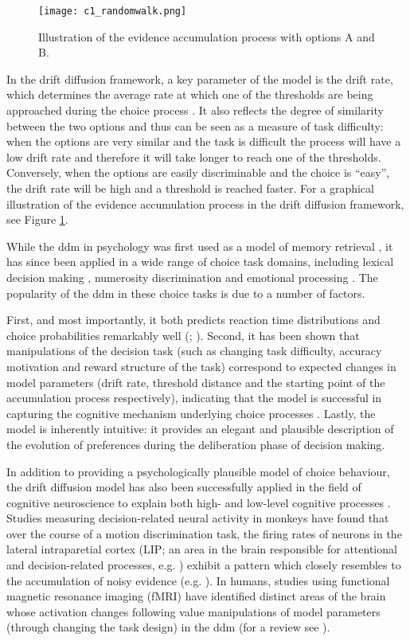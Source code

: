 \documentclass[11pt,a4paper]{article}
\begin{document}
\begin{figure}[h]
\centering
\caption{Illustration of the evidence accumulation process with options A and
B.}
\texttt{[image: c1\_randomwalk.png]}
\label{fig:randomwalk}
\end{figure}


In the drift diffusion framework, a key parameter of the model is the drift rate, which determines the average rate at which one of the thresholds are being approached during the choice process \cite{Voss2004a}. It also reflects the degree of similarity between the two options and thus can be seen as a measure of task difficulty: when the options are very similar and the task is difficult the process will have a low drift rate and therefore it will take longer to reach one of the thresholds. Conversely, when the options are easily discriminable and the choice is “easy”, the drift rate will be high and a threshold is reached faster. For a graphical illustration of the evidence accumulation process in the drift diffusion framework, see Figure \ref{fig:randomwalk}.

While the ddm in psychology was first used as a model of memory retrieval \cite{Ratcliff1978b}, it has since been applied in a wide range of choice task domains, including lexical decision making \cite{Ratcliff2004}, numerosity discrimination \cite{Leite2011} and emotional processing \cite{Mueller2016}. The popularity of the ddm in these choice tasks is due to a number of factors. 

First, and most importantly, it both predicts reaction time distributions and choice probabilities remarkably well (; ). Second, it has been shown that manipulations of the decision task (such as changing task difficulty, accuracy motivation and reward structure of the task) correspond to expected changes in model parameters (drift rate, threshold distance and the starting point of the accumulation process respectively), indicating that the model is successful in capturing the cognitive mechanism underlying choice processes \cite{Voss2004a}. Lastly, the model is inherently intuitive: it provides an elegant and plausible description of the evolution of preferences during the deliberation phase of decision making.

In addition to providing a psychologically plausible model of choice behaviour, the drift diffusion model has also been successfully applied in the field of cognitive neuroscience to explain both high- and low-level cognitive processes \cite{Forstmann2016}. Studies measuring decision-related neural activity in monkeys have found that over the course of a motion discrimination task, the firing rates of neurons in the lateral intraparetial cortex (LIP; an area in the brain responsible for attentional and decision-related processes, e.g. ) exhibit a pattern which closely resembles to the accumulation of noisy evidence (e.g. ). In humans, studies using functional magnetic resonance imaging (fMRI) have identified distinct areas of the brain whose activation changes following value manipulations of model parameters (through changing the task design) in the ddm (for a review see ). 
\end{document}
